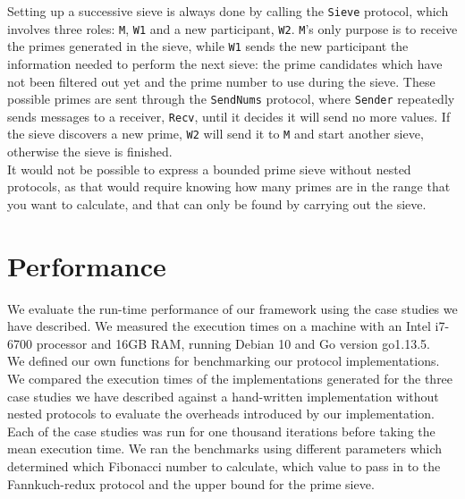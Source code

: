 \documentclass[12pt,twoside]{report}
\begin{document}
Setting up a successive sieve is always done by calling the \texttt{Sieve} protocol, which involves three roles: \texttt{M}, \texttt{W1} and a new participant, \texttt{W2}. \texttt{M}'s only purpose is to receive the primes generated in the sieve, while \texttt{W1} sends the new participant the information needed to perform the next sieve: the prime candidates which have not been filtered out yet and the prime number to use during the sieve. These possible primes are sent through the \texttt{SendNums} protocol, where \texttt{Sender} repeatedly sends messages to a receiver, \texttt{Recv}, until it decides it will send no more values. If the sieve discovers a new prime, \texttt{W2} will send it to \texttt{M} and start another sieve, otherwise the sieve is finished.\\

It would not be possible to express a bounded prime sieve without nested protocols, as that would require knowing how many primes are in the range that you want to calculate, and that can only be found by carrying out the sieve. 

\section{Performance}\label{performance}

We evaluate the run-time performance of our framework using the case studies we have described. We measured the execution times on a machine with an Intel i7-6700 processor and 16GB RAM, running Debian 10 and Go version go1.13.5. \\


We defined our own functions for benchmarking our protocol implementations. We compared the execution times of the implementations generated for the three case studies we have described against a hand-written implementation without nested protocols to evaluate the overheads introduced by our implementation. Each of the case studies was run for one thousand iterations before taking the mean execution time. We ran the benchmarks using different parameters which determined which Fibonacci number to calculate, which value to pass in to the Fannkuch-redux protocol and the upper bound for the prime sieve.\\
\end{document}
